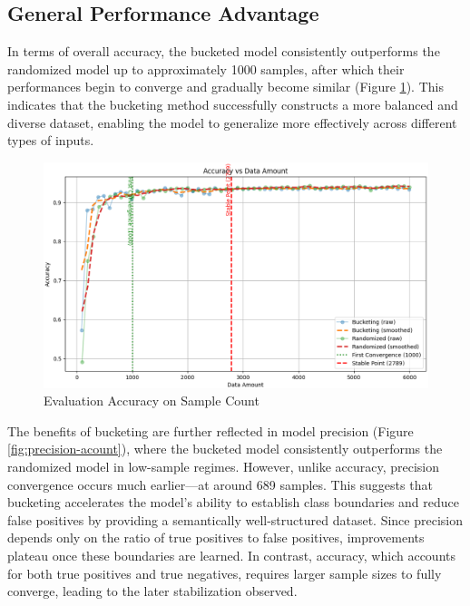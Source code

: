 \documentclass[twocolumn]{article}
\renewcommand{\indent}{\hspace*{2em}}
\begin{document}
\subsection{General Performance Advantage}

\indent In terms of overall accuracy, the bucketed model consistently outperforms the randomized model up to approximately 1000 samples, after which their performances begin to converge and gradually become similar (Figure \ref{fig:accuracy-count}). This indicates that the bucketing method successfully constructs a more balanced and diverse dataset, enabling the model to generalize more effectively across different types of inputs.
\begin{figure}[H]
    \centering
    \includegraphics[width=\linewidth]{accuracy-count-2.eps}
    \caption{Evaluation Accuracy on Sample Count}
    \label{fig:accuracy-count}
\end{figure}
\indent The benefits of bucketing are further reflected in model precision (Figure \ref{fig:precision-acount}), where the bucketed model consistently outperforms the randomized model in low-sample regimes. However, unlike accuracy, precision convergence occurs much earlier—at around 689 samples. This suggests that bucketing accelerates the model’s ability to establish class boundaries and reduce false positives by providing a semantically well-structured dataset. Since precision depends only on the ratio of true positives to false positives, improvements plateau once these boundaries are learned. In contrast, accuracy, which accounts for both true positives and true negatives, requires larger sample sizes to fully converge, leading to the later stabilization observed.
\end{document}
